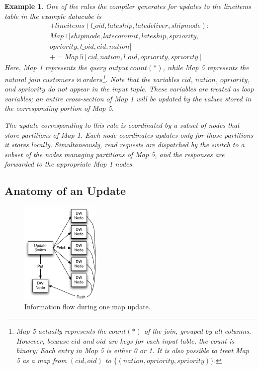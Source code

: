 \documentclass{sig-alternate}
\newtheorem{example}[theorem]{Example}
\newtheorem{example}{Example}
\begin{document}
\begin{example}
One of the rules the compiler generates for updates to the lineitems table in the example datacube is
{\footnotesize
\begin{eqnarray*}
+lineitems(l\_oid,lateship,latedeliver,shipmode) : \\
Map\ 1[shipmode,latecommit,lateship,spriority,\\ opriority,l\_oid,cid,nation] \\
 += Map\ 5[cid,nation,l\_oid,opriority,spriority]
\end{eqnarray*}}
\noindent Here, Map 1 represents the query output $count(*)$, while Map 5 represents the natural join $customers \bowtie orders$\footnote{Map 5 actually represents the $count(*)$ of the join, grouped by all columns.  However, because $cid$ and $oid$ are keys for each input table, the count is binary; Each entry in Map 5 is either 0 or 1.  It is also possible to treat Map 5 as a map from $(cid,oid)$ to $\{(nation, opriority, spriority)\}$. }.  Note that the variables $cid$, $nation$, $opriority$, and $spriority$ do not appear in the input tuple.  These variables are treated as loop variables; an entire cross-section of Map 1 will be updated by the values stored in the corresponding portion of Map 5.  

The update corresponding to this rule is coordinated by a subset of nodes that store partitions of Map 1.  Each node coordinates updates only for those partitions it stores locally.  Simultaneously, read requests are dispatched by the switch to a subset of the nodes managing partitions of Map 5, and the responses are forwarded to the appropriate Map 1 nodes.  
\end{example}

\subsection{Anatomy of an Update}

\begin{figure}
\begin{center}
\includegraphics[width=1.5in]{images/UpdateStep.pdf}
\caption{Information flow during one map update.}
\label{fig:updatestep}
\end{center}
\end{figure}
\end{document}
